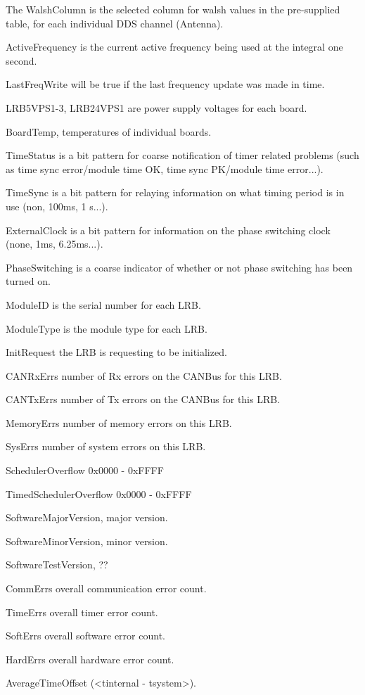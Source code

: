 \documentclass[preprint]{aastex}
\begin{document}
The WalshColumn is the selected column for walsh values in the pre-supplied
table, for each individual DDS channel (Antenna).

ActiveFrequency is the current active frequency being used at the
integral one second.

LastFreqWrite will be true if the last frequency update was made
in time.

LRB5VPS1-3, LRB24VPS1 are power supply voltages for each board.

BoardTemp, temperatures of individual boards.

TimeStatus is a bit pattern for coarse notification of timer related
problems (such as time sync error/module time OK, time sync PK/module time error...).

TimeSync is a bit pattern for relaying information on what timing period
is in use (non, 100ms, 1 s...).

ExternalClock is a bit pattern for information on the phase switching clock
(none, 1ms, 6.25ms...).

PhaseSwitching is a coarse indicator of whether or not phase switching
has been turned on.

ModuleID is the serial number for each LRB.

ModuleType is the module type for each LRB.

InitRequest the LRB is requesting to be initialized.

CANRxErrs number of Rx errors on the CANBus for this LRB.

CANTxErrs number of Tx errors on the CANBus for this LRB.

MemoryErrs number of memory errors on this LRB.

SysErrs number of system errors on this LRB.

SchedulerOverflow 0x0000 - 0xFFFF

TimedSchedulerOverflow 0x0000 - 0xFFFF

SoftwareMajorVersion, major version.

SoftwareMinorVersion, minor version.

SoftwareTestVersion, ??

CommErrs overall communication error count.

TimeErrs overall timer error count.

SoftErrs overall software error count.

HardErrs overall hardware error count.

AverageTimeOffset (<t{internal} - t{system}>).
\end{document}
